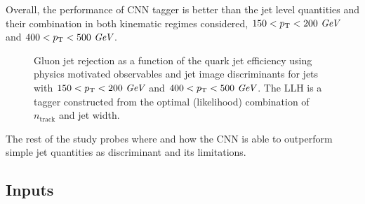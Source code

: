 Overall, the performance of CNN tagger is better than the jet level quantities and their combination in both kinematic regimes considered, $150<p_{{\rm T}}<200~\textit{GeV}$ and $400<p_{{\rm T}}<500~\textit{GeV}$.

\begin{figure}[htpb]
\begin{center}
\caption{Gluon jet rejection as a function of the quark jet efficiency using physics motivated observables and jet image discriminants
for jets with \protect{} $150<p_{{\rm T}}<200~\textit{GeV}$ and \protect{} $400<p_{{\rm T}}<500~\textit{GeV}$.  The LLH is a tagger constructed from the optimal (likelihood) combination of $n_\text{track}$ and jet width. }
\label{fig:classifiers}
\end{center}
\end{figure}

The rest of the study probes where and how the CNN is able to outperform simple jet quantities as discriminant and its limitations.

\subsection{Inputs}

